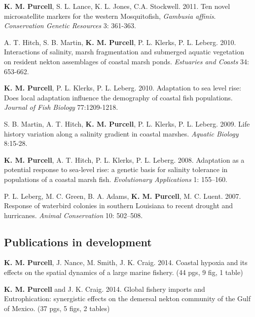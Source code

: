 \documentclass[letterpaper]{article}
\renewenvironment{itemize}{
  \begin{list}{}{
    \setlength{\leftmargin}{1em}
  }
}{
  \end{list}
}
\begin{document}
\begin{itemize}
		\item \textbf{K. M. Purcell}, S. L. Lance, K. L. Jones, C.A. Stockwell. 2011. Ten novel microsatellite markers for the western Mosquitofish, \textit{Gambusia affinis}. \textit{Conservation Genetic Resources} 3: 361-363.
		\item A. T. Hitch, S. B. Martin, \textbf{K. M. Purcell}, P. L. Klerks, P. L. Leberg. 2010. Interactions of salinity, marsh fragmentation and submerged aquatic vegetation on resident nekton assemblages of coastal marsh ponds. \textit{Estuaries and Coasts} 34: 653-662.
		\item \textbf{K. M. Purcell}, P. L. Klerks, P. L. Leberg. 2010. Adaptation to sea level rise: Does local adaptation influence the demography of coastal fish populations. \textit{Journal of Fish Biology} 77:1209-1218.
		\item S. B. Martin, A. T. Hitch, \textbf{K. M. Purcell}, P. L. Klerks, P. L. Leberg. 2009. Life history variation along a salinity gradient in coastal marshes. \textit{Aquatic Biology} 8:15-28.
		\item \textbf{K. M. Purcell}, A. T. Hitch, P. L. Klerks, P. L. Leberg. 2008. Adaptation as a potential response to sea-level rise: a genetic basis for salinity tolerance in populations of a coastal marsh fish. \textit{Evolutionary Applications} 1: 155–160.
		\item P. L. Leberg, M. C. Green, B. A. Adams, \textbf{K. M. Purcell}, M. C. Luent. 2007. Response of waterbird colonies in southern Louisiana to recent drought and hurricanes. \textit{Animal Conservation} 10: 502–508.
	 \end{itemize}
 
\subsection*{Publications in development}
	\begin{itemize}
		 \item \textbf{K. M. Purcell}, J. Nance, M. Smith, J. K. Craig. 2014. Coastal hypoxia and its effects on the spatial dynamics of a large marine fishery. (44 pgs, 9 fig, 1 table)
		 \item \textbf{K. M. Purcell} and J. K. Craig. 2014. Global fishery imports and Eutrophication: synergistic effects on the demersal nekton community of the Gulf of Mexico. (37 pgs, 5 figs, 2 tables)
	\end{itemize}
\end{document}
